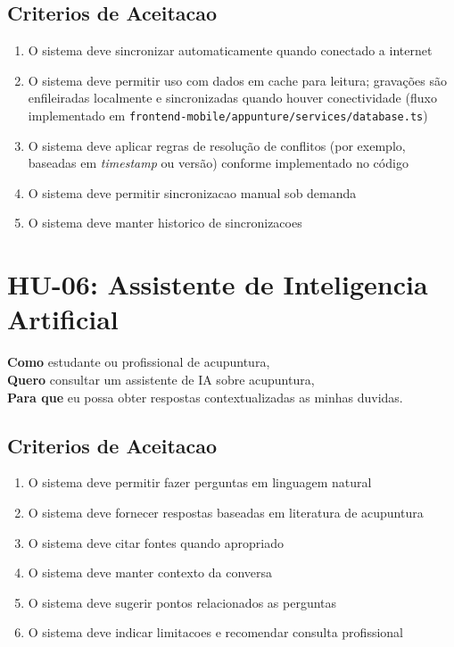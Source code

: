 \begin{apendicesenv}
\subsection*{Criterios de Aceitacao}

\begin{enumerate}
    \item O sistema deve sincronizar automaticamente quando conectado a internet
    \item O sistema deve permitir uso com dados em cache para leitura; gravações são enfileiradas localmente e sincronizadas quando houver conectividade (fluxo implementado em \texttt{frontend-mobile/appunture/services/database.ts})
    \item O sistema deve aplicar regras de resolução de conflitos (por exemplo, baseadas em \textit{timestamp} ou versão) conforme implementado no código
    \item O sistema deve permitir sincronizacao manual sob demanda
    \item O sistema deve manter historico de sincronizacoes
\end{enumerate}

\section{HU-06: Assistente de Inteligencia Artificial}
\label{hu:ia}

\textbf{Como} estudante ou profissional de acupuntura, \\
\textbf{Quero} consultar um assistente de IA sobre acupuntura, \\
\textbf{Para que} eu possa obter respostas contextualizadas as minhas duvidas.

\subsection*{Criterios de Aceitacao}

\begin{enumerate}
    \item O sistema deve permitir fazer perguntas em linguagem natural
    \item O sistema deve fornecer respostas baseadas em literatura de acupuntura
    \item O sistema deve citar fontes quando apropriado
    \item O sistema deve manter contexto da conversa
    \item O sistema deve sugerir pontos relacionados as perguntas
    \item O sistema deve indicar limitacoes e recomendar consulta profissional
\end{enumerate}


\end{apendicesenv}
